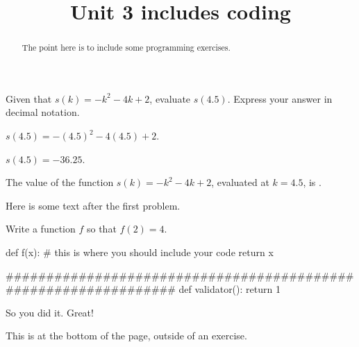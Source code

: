 \documentclass{ximera}
\title{Unit 3 includes coding}
\begin{document}
\begin{abstract}
  The point here is to include some programming exercises.
\end{abstract}

\begin{exercise}
Given that $s(k)=-k^2-4 k+2$, evaluate $s(4.5)$. Express your answer in decimal notation.
\begin{solution}
\begin{hint}
$s(4.5)=-(4.5)^2-4 (4.5)+2$.
\end{hint}
\begin{hint}
$s(4.5)=-36.25$.
\end{hint}
The value of the function $s(k)=-k^2-4 k+2$, evaluated at $k=4.5$, is .
\end{solution}

Here is some text after the first problem.
\end{exercise}

\begin{exercise}
Write a function $f$ so that $f(2) = 4$.

\begin{solution}
\begin{python}
  def f(x):
    # this is where you should include your code
    return x

################################################################
  def validator():
    return 1
\end{python}
\end{solution}

So you did it.  Great!
\end{exercise}

This is at the bottom of the page, outside of an exercise.
\end{document}
